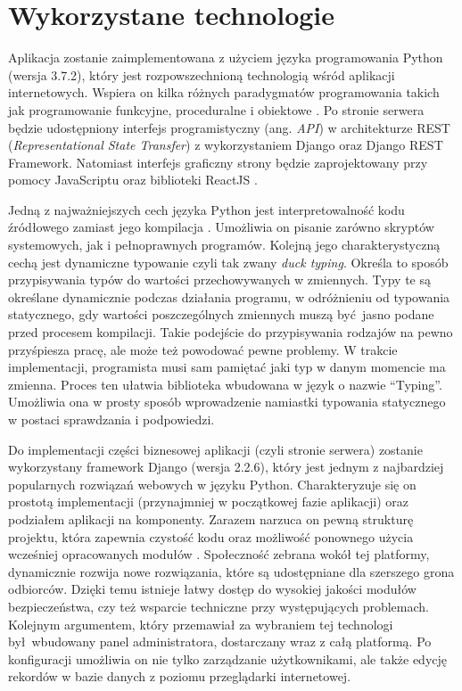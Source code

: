 \section{Wykorzystane technologie}
Aplikacja zostanie zaimplementowana z użyciem języka programowania Python (wersja 3.7.2), który jest rozpowszechnioną technologią wśród aplikacji internetowych. Wspiera on kilka różnych paradygmatów programowania takich jak programowanie funkcyjne, proceduralne i obiektowe \cite{book_3}. Po stronie serwera będzie udostępniony interfejs programistyczny (ang. \textit{API}) w architekturze REST (\textit{Representational State Transfer}) z wykorzystaniem Django oraz Django REST Framework. Natomiast interfejs graficzny strony będzie zaprojektowany przy pomocy JavaScriptu \cite{misc_js} oraz biblioteki ReactJS \cite{misc_react}.

Jedną z najważniejszych cech języka Python jest interpretowalność kodu źródłowego zamiast jego kompilacja \cite{misc_python}. Umożliwia on pisanie zarówno skryptów systemowych, jak i pełnoprawnych programów. Kolejną jego charakterystyczną cechą jest dynamiczne typowanie czyli tak zwany \textit{duck typing}. Określa to sposób przypisywania typów do wartości przechowywanych w zmiennych. Typy te są określane dynamicznie podczas działania programu, w odróżnieniu od typowania statycznego, gdy wartości poszczególnych zmiennych muszą być jasno podane przed procesem kompilacji. Takie podejście do przypisywania rodzajów na pewno przyśpiesza pracę, ale może też powodować pewne problemy. W trakcie implementacji, programista musi sam pamiętać jaki typ w danym momencie ma zmienna. Proces ten ułatwia biblioteka wbudowana w język o nazwie \enquote{Typing}. Umożliwia ona w prosty sposób wprowadzenie namiastki typowania statycznego w postaci sprawdzania i podpowiedzi.

Do implementacji części biznesowej aplikacji (czyli stronie serwera) zostanie wykorzystany framework Django (wersja 2.2.6), który jest jednym z najbardziej popularnych rozwiązań webowych w języku Python. Charakteryzuje się on prostotą implementacji (przynajmniej w początkowej fazie aplikacji) oraz podziałem aplikacji na komponenty. Zarazem narzuca on pewną strukturę projektu, która zapewnia czystość kodu oraz możliwość ponownego użycia wcześniej opracowanych modułów \cite{misc_django}. Społeczność zebrana wokół tej platformy, dynamicznie rozwija nowe rozwiązania, które są udostępniane dla szerszego grona odbiorców. Dzięki temu istnieje łatwy dostęp do wysokiej jakości modułów bezpieczeństwa, czy też wsparcie techniczne przy występujących problemach. Kolejnym argumentem, który przemawiał za wybraniem tej technologi był wbudowany panel administratora, dostarczany wraz z całą platformą. Po konfiguracji umożliwia on nie tylko zarządzanie użytkownikami, ale także edycję rekordów w bazie danych z poziomu przeglądarki internetowej. 

